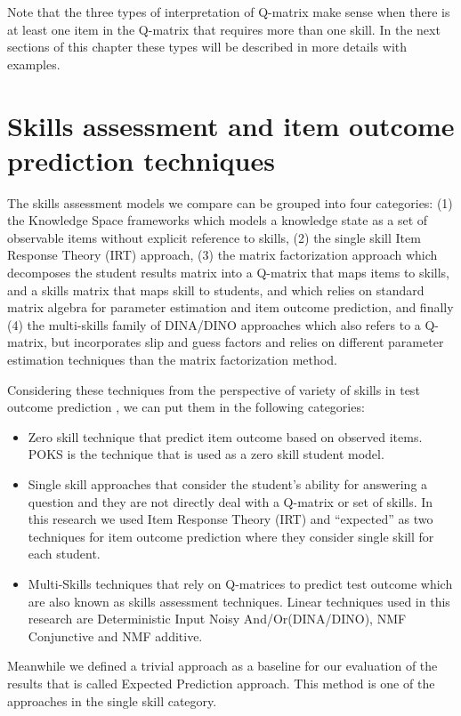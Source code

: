 Note that the three types of interpretation of Q-matrix make sense when there is at least one item in the Q-matrix that requires more than one skill. In the next sections of this chapter these types will be described in more details with examples.



\section{Skills assessment and item outcome prediction techniques}

The skills assessment models we compare can be grouped into four categories: (1) the Knowledge Space frameworks which models a knowledge state as a set of observable items without explicit reference to skills, (2) the single skill Item Response Theory (IRT) approach, (3) the matrix factorization approach which decomposes the student results matrix into a Q-matrix that maps items to skills, and a skills matrix that maps skill to students, and which relies on standard matrix algebra for parameter estimation and item outcome prediction, and finally (4) the multi-skills family of DINA/DINO approaches which also refers to a Q-matrix, but incorporates slip and guess factors and relies on different parameter estimation techniques than the matrix factorization method.

Considering  these techniques from the perspective of variety of skills in test outcome prediction , we can put them in the following categories: 

\begin{itemize}

\item Zero skill technique that predict item outcome based on observed items. POKS is the technique that is used as a zero skill student model.
\item Single skill approaches that consider the student's ability for answering a question and they are not directly deal with a Q-matrix or set of skills. In this research we used Item Response Theory (IRT) and ``expected'' as two  techniques for item outcome prediction where they consider single skill for each student.
\item Multi-Skills techniques that rely on Q-matrices to predict test outcome which are also known as skills assessment techniques. Linear techniques used in this research are Deterministic Input Noisy And/Or(DINA/DINO), NMF Conjunctive and \ac{NMF} additive.

\end{itemize}  
Meanwhile we defined a trivial approach as a baseline for our evaluation of the results that is called Expected Prediction approach. This method is one of the approaches in the single skill category.

